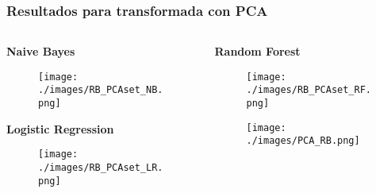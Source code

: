 \documentclass[10pt]{beamer}
\begin{document}
\begin{frame}[c, squeeze] \frametitle{Resultados para transformada con PCA}
\scriptsize
 \begin{columns}
\begin{column}{0.5\textwidth}
\begin{center}
\textbf{Naive Bayes} 
\begin{figure}
 \texttt{[image: ./images/RB\_PCAset\_NB.png]}
\end{figure}
\textbf{Logistic Regression} %
\begin{figure}
 \texttt{[image: ./images/RB\_PCAset\_LR.png]}
\end{figure}
\end{center}
\end{column}

\begin{column}{0.5\textwidth}
\begin{center}
\textbf{Random Forest}%
\begin{figure}
 \texttt{[image: ./images/RB\_PCAset\_RF.png]}
\end{figure}

 \begin{figure}
 \centering
 \texttt{[image: ./images/PCA\_RB.png]}
\end{figure}
\end{center}
\end{column}
\end{columns}
\end{frame}
\end{document}
